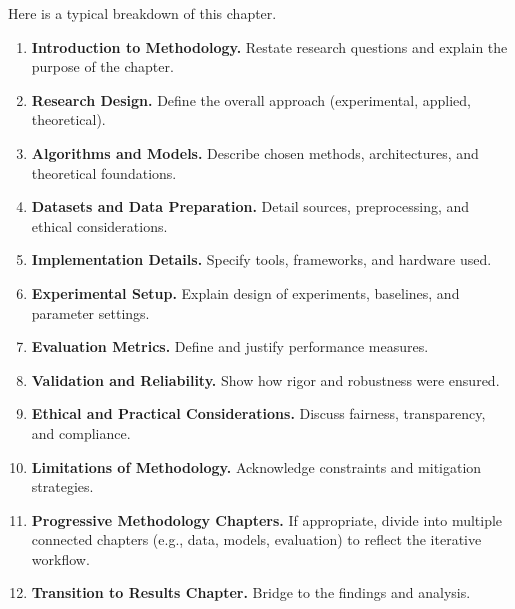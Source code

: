 \documentclass[PCOM,Thesis,Review]{mpThesis}
\newcommand{\Hd}[1]{{\color{SteelBlue}\bf#1.}}
\begin{document}
\begin{MainMatter}
\begin{Remark}
Here is a typical breakdown of this chapter.
\begin{enumerate}
\item \Hd{Introduction to Methodology}
Restate research questions and explain the purpose of the chapter.

\item \Hd{Research Design}
Define the overall approach (experimental, applied, theoretical).

\item \Hd{Algorithms and Models}
Describe chosen methods, architectures, and theoretical foundations.

\item \Hd{Datasets and Data Preparation}
Detail sources, preprocessing, and ethical considerations.

\item \Hd{Implementation Details}
Specify tools, frameworks, and hardware used.

\item \Hd{Experimental Setup}
Explain design of experiments, baselines, and parameter settings.

\item \Hd{Evaluation Metrics}
Define and justify performance measures.

\item \Hd{Validation and Reliability}
Show how rigor and robustness were ensured.

\item \Hd{Ethical and Practical Considerations}
Discuss fairness, transparency, and compliance.

\item \Hd{Limitations of Methodology}
Acknowledge constraints and mitigation strategies.

\item \Hd{Progressive Methodology Chapters}
If appropriate, divide into multiple connected chapters (e.g., data, models, evaluation) to reflect the iterative workflow.

\item \Hd{Transition to Results Chapter}
Bridge to the findings and analysis.
\end{enumerate}


\end{Remark}
\end{MainMatter}
\end{document}
